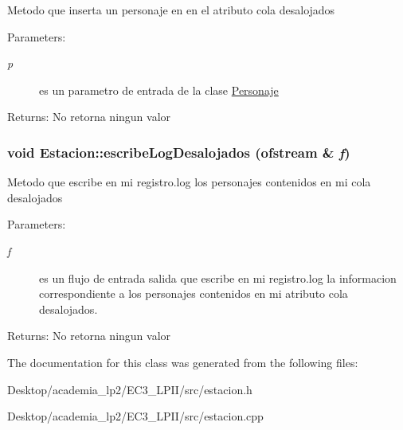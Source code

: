 Metodo que inserta un personaje en en el atributo cola desalojados \begin{Desc}
\item[Parameters:]
\begin{description}
\item[{\em p}]es un parametro de entrada de la clase \hyperlink{classPersonaje}{Personaje} \end{description}
\end{Desc}
\begin{Desc}
\item[Returns:]No retorna ningun valor \end{Desc}
\hypertarget{classEstacion_fd81b9f346dce9a850fc2c612949d211}{
\subsubsection[escribeLogDesalojados]{\setlength{\rightskip}{0pt plus 5cm}void Estacion::escribeLogDesalojados (ofstream \& {\em f})}}
\label{classEstacion_fd81b9f346dce9a850fc2c612949d211}


Metodo que escribe en mi registro.log los personajes contenidos en mi cola desalojados \begin{Desc}
\item[Parameters:]
\begin{description}
\item[{\em f}]es un flujo de entrada salida que escribe en mi registro.log la informacion correspondiente a los personajes contenidos en mi atributo cola desalojados. \end{description}
\end{Desc}
\begin{Desc}
\item[Returns:]No retorna ningun valor \end{Desc}


The documentation for this class was generated from the following files:\begin{CompactItemize}
\item 
Desktop/academia\_\-lp2/EC3\_\-LPII/src/estacion.h\item 
Desktop/academia\_\-lp2/EC3\_\-LPII/src/estacion.cpp\end{CompactItemize}
